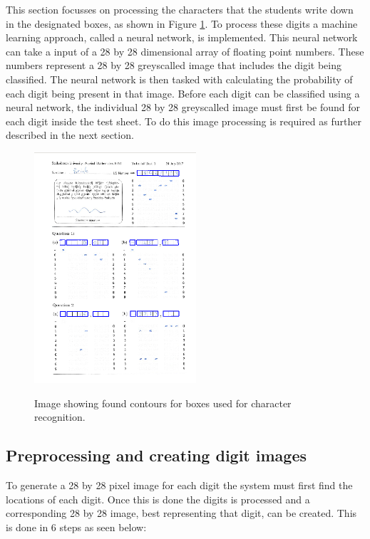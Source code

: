 This section focusses on processing the characters that the students write down in the designated boxes, as shown in Figure \ref{fig:sa}. To process these digits a machine learning approach, called a neural network, is implemented. This neural network can take a input of a 28 by 28 dimensional array of floating point numbers. These numbers represent a 28 by 28 greyscalled image that includes the digit being classified. The neural network is then tasked with calculating the probability of each digit being present in that image. Before each digit can be classified using a neural network, the individual 28 by 28 greyscalled image must first be found for each digit inside the test sheet. To do this image processing is required as further described in the next section.
\begin{figure}
  \centering
  \includegraphics[width=6cm]{DigitScan}\\
  \caption{Image showing found contours for boxes used for character recognition.}
  \label{fig:sa}
\end{figure}

\subsection{Preprocessing and creating digit images}
\label{sec:preprocess}

To generate a 28 by 28 pixel image for each digit the system must first find the locations of each digit. Once this is done the digits is processed and a corresponding 28 by 28 image, best representing that digit, can be created. This is done in 6 steps as seen below:

